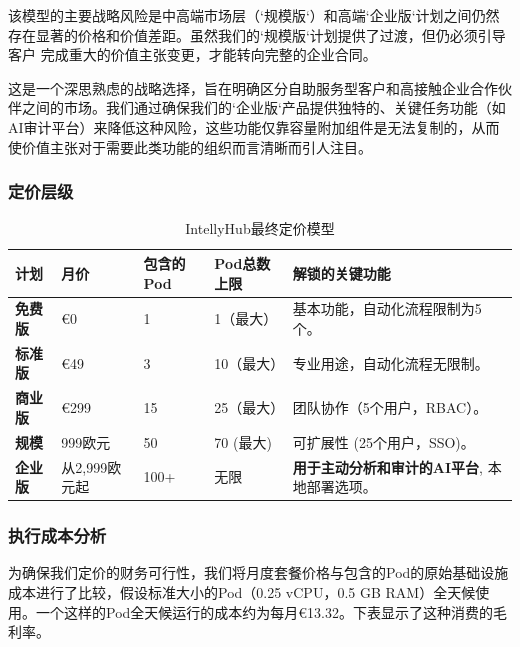 \documentclass[11点, A4纸, 单面]{article}
\begin{document}
该模型的主要战略风险是中高端市场层（`规模版`）和高端`企业版`计划之间仍然存在显著的价格和价值差距。虽然我们的`规模版`计划提供了过渡，但仍必须引导客户 完成重大的价值主张变更，才能转向完整的企业合同。

这是一个深思熟虑的战略选择，旨在明确区分自助服务型客户和高接触企业合作伙伴之间的市场。我们通过确保我们的`企业版`产品提供独特的、关键任务功能（如AI审计平台）来降低这种风险，这些功能仅靠容量附加组件是无法复制的，从而使价值主张对于需要此类功能的组织而言清晰而引人注目。

\subsubsection{定价层级}

\begin{table}[H]
\centering
\caption{IntellyHub最终定价模型}
\label{tab:final_pricing_model}
\begin{tabularx}{\textwidth}{l L L L L} 
\toprule
\textbf{计划} & \textbf{月价} & \textbf{包含的Pod} & \textbf{Pod总数上限} & \textbf{解锁的关键功能} \\
\midrule
\textbf{免费版} & \euro{0} & 1 & 1（最大） & 基本功能，自动化流程限制为5个。 \\
\addlinespace
\textbf{标准版} & \euro{49} & 3 & 10（最大） & 专业用途，自动化流程无限制。 \\
\addlinespace
\textbf{商业版} & \euro{299} & 15 & 25（最大） & 团队协作（5个用户，RBAC）。 \\
\addlinespace



\textbf{规模} & 999欧元 & 50 & 70 (最大) & 可扩展性 (25个用户，SSO)。 \\
\addlinespace
\textbf{企业版} & 从2,999欧元起 & 100+ & 无限 & \textbf{用于主动分析和审计的AI平台}, 本地部署选项。 \\
\bottomrule
\end{tabularx}
\end{table}

\subsubsection{执行成本分析}

为确保我们定价的财务可行性，我们将月度套餐价格与包含的Pod的原始基础设施成本进行了比较，假设标准大小的Pod（0.25 vCPU，0.5 GB RAM）全天候使用。一个这样的Pod全天候运行的成本约为每月\euro{13.32}。下表显示了这种消费的毛利率。
\end{document}
